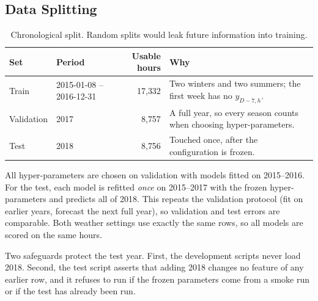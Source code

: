 \subsection{Data Splitting}
\label{sec:splitting}

\begin{table}[H]
  \centering
  \small
  \caption{Chronological split. Random splits would leak future information into training.}
  \label{tab:split}
  \begin{tabularx}{\linewidth}{@{}l l r Y@{}}
    \toprule
    Set & Period & Usable hours & Why \\
    \midrule
    Train & 2015-01-08 -- 2016-12-31 & 17{,}332 & Two winters and two summers; the first week has no
      $y_{D-7,h}$. \\
    Validation & 2017 & 8{,}757 & A full year, so every season counts when choosing
      hyper-parameters. \\
    Test & 2018 & 8{,}756 & Touched once, after the configuration is frozen. \\
    \bottomrule
  \end{tabularx}
\end{table}

All hyper-parameters are chosen on validation with models fitted on 2015--2016. For the test, each
model is refitted \emph{once} on 2015--2017 with the frozen hyper-parameters and predicts all of
2018. This repeats the validation protocol (fit on earlier years, forecast the next full year), so
validation and test errors are comparable. Both weather settings use exactly the same rows, so all
models are scored on the same hours.

Two safeguards protect the test year. First, the development scripts never load 2018. Second, the
test script asserts that adding 2018 changes no feature of any earlier row, and it refuses to run
if the frozen parameters come from a smoke run or if the test has already been run.
